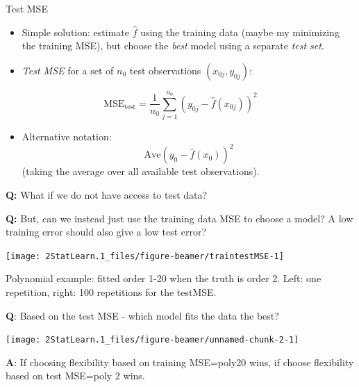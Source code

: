\documentclass[ignorenonframetext,]{beamer}
\providecommand{\tightlist}{%
  \setlength{\itemsep}{0pt}\setlength{\parskip}{0pt}}
\begin{document}
\begin{frame}

\begin{block}{Test MSE}

\begin{itemize}
\item
  Simple solution: estimate \(\hat{f}\) using the training data (maybe
  my minimizing the training MSE), but choose the \emph{best} model
  using a separate \emph{test set}.
\item
  \emph{Test MSE} for a set of \(n_0\) test observations
  \((x_{0j},y_{0j})\):
\end{itemize}

\[ \text{MSE}_{\text{test}}=\frac{1}{n_0}\sum_{j=1}^{n_0} (y_{0j}-\hat{f}(x_{0j}))^2\]

\begin{itemize}
\tightlist
\item
  Alternative notation: \[\text{Ave}(y_0-\hat{f}(x_0))^2\] (taking the
  average over all available test observations).
\end{itemize}

\end{block}

\end{frame}

\begin{frame}

\textbf{Q:} What if we do not have access to test data?

\vspace{2mm}

\textbf{Q:} But, can we instead just use the training data MSE to choose
a model? A low training error should also give a low test error?

\end{frame}

\begin{frame}

\begin{center}\texttt{[image: 2StatLearn.1\_files/figure-beamer/traintestMSE-1]} \end{center}

Polynomial example: fitted order 1-20 when the truth is order 2. Left:
one repetition, right: 100 repetitions for the testMSE.

\textbf{Q}: Based on the test MSE - which model fits the data the best?

\end{frame}

\begin{frame}

\begin{center}\texttt{[image: 2StatLearn.1\_files/figure-beamer/unnamed-chunk-2-1]} \end{center}

\textbf{A}: If choosing flexibility based on training MSE=poly20 wins,
if choose flexibility based on test MSE=poly 2 wins.

\end{frame}
\end{document}
